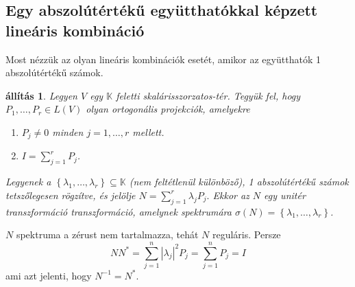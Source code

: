 \documentclass[9pt, a4paper, showtrims]{memoir}
\makeatletter
\renewenvironment{proof}[1][\proofname]
    {\par\pushQED{\qed}%
    \normalfont \topsep6\p@\@plus6\p@\relax
    \trivlist
    \item[\hskip\labelsep
        \itshape
    #1\@addpunct{:}]\ignorespaces}
    {\popQED\endtrivlist\@endpefalse}
\theoremstyle{plain}
\newtheorem{proposition}{állítás}[chapter]
\theoremstyle{remark}
\theoremstyle{definition}
\makeatother
\begin{document}
\subsection{Egy abszolútértékű együtthatókkal képzett lineáris kombináció}
Most nézzük az olyan lineáris kombinációk esetét, amikor az együtthatók 1 abszolútértékű számok.
\begin{proposition}\label{pr:normlinkombegys}
    Legyen $V$ egy $\mathbb{K}$ feletti skalárisszorzatos-tér.
    Tegyük fel, hogy $P_1,\dots,P_r\in L\left( V \right)$ olyan ortogonális projekciók,
    amelyekre
    \begin{enumerate}
        \item $P_j\neq 0$ minden $j=1,\dots,r$ mellett.
        \item $I=\sum_{j=1}^rP_j$.
    \end{enumerate}
    Legyenek a $\left\{ \lambda_1,\dots,\lambda_r \right\}\subseteq \mathbb{K}$
    (nem feltétlenül különböző),
    1 abszolútértékű számok tetszőlegesen rögzítve, 
    és jelölje
    \(
        N
        =
        \sum_{j=1}^r\lambda_jP_j.
    \)
    Ekkor az $N$ egy \emph{unitér transzformáció} transzformáció, 
    amelynek spektrumára $\sigma\left( N \right)=\left\{ \lambda_1,\dots,\lambda_r \right\}$.
\end{proposition}
\begin{proof}
    $N$ spektruma a zérust nem tartalmazza, tehát $N$ reguláris.
    Persze $$NN^\ast=\sum_{j=1}^n|\lambda_j|^2P_j=\sum_{j=1}^nP_j=I$$ ami azt jelenti,
    hogy $N^{-1}=N^\ast$.
\end{proof}
\end{document}
